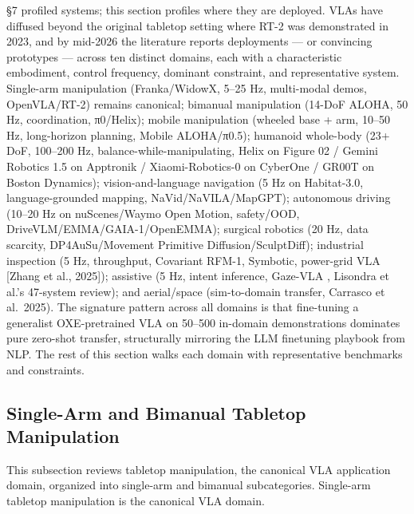 \documentclass{article}
\begin{document}
§7 profiled systems; this section profiles where they are deployed. VLAs have diffused beyond the original tabletop setting where RT-2 was demonstrated in 2023, and by mid-2026 the literature reports deployments --- or convincing prototypes --- across ten distinct domains, each with a characteristic embodiment, control frequency, dominant constraint, and representative system. Single-arm manipulation (Franka/WidowX, 5--25 Hz, multi-modal demos, OpenVLA/RT-2) remains canonical; bimanual manipulation (14-DoF ALOHA, 50 Hz, coordination, π0/Helix); mobile manipulation (wheeled base + arm, 10--50 Hz, long-horizon planning, Mobile ALOHA/π0.5); humanoid whole-body (23+ DoF, 100--200 Hz, balance-while-manipulating, Helix on Figure 02 / Gemini Robotics 1.5 on Apptronik / Xiaomi-Robotics-0 on CyberOne / GR00T on Boston Dynamics); vision-and-language navigation (5 Hz on Habitat-3.0, language-grounded mapping, NaVid/NaVILA/MapGPT); autonomous driving (10--20 Hz on nuScenes/Waymo Open Motion, safety/OOD, DriveVLM/EMMA/GAIA-1/OpenEMMA); surgical robotics (20 Hz, data scarcity, DP4AuSu/Movement Primitive Diffusion/SculptDiff); industrial inspection (5 Hz, throughput, Covariant RFM-1, Symbotic, power-grid VLA {[}Zhang et al., 2025{]}); assistive (5 Hz, intent inference, Gaze-VLA \cite{tay2026intentataglancegaz}, Lisondra et al.'s 47-system review); and aerial/space (sim-to-domain transfer, Carrasco et al.~2025). The signature pattern across all domains is that fine-tuning a generalist OXE-pretrained VLA on 50--500 in-domain demonstrations dominates pure zero-shot transfer, structurally mirroring the LLM finetuning playbook from NLP. The rest of this section walks each domain with representative benchmarks and constraints.

\subsection{Single-Arm and Bimanual Tabletop Manipulation}\label{single-arm-and-bimanual-tabletop-manipulation}

This subsection reviews tabletop manipulation, the canonical VLA application domain, organized into single-arm and bimanual subcategories. Single-arm tabletop manipulation is the canonical VLA domain.
\end{document}
